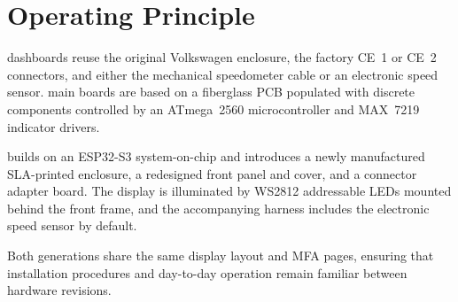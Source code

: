 \chapter{Operating Principle} \label{ch:operating-principle}

\ReplicaGenOne{} dashboards reuse the original Volkswagen enclosure, the factory CE~1 or CE~2 connectors, and either the mechanical speedometer cable or an electronic speed sensor.
\ReplicaGenOneShort{} main boards are based on a fiberglass PCB populated with discrete components controlled by an ATmega~2560 microcontroller and MAX~7219 indicator drivers.

\ReplicaNextLong{} builds on an ESP32-S3 system-on-chip and introduces a newly manufactured SLA-printed enclosure, a redesigned front panel and cover, and a connector adapter board.
The \ReplicaNextShort{} display is illuminated by WS2812 addressable LEDs mounted behind the front frame, and the accompanying harness includes the electronic speed sensor by default.

Both generations share the same display layout and MFA pages, ensuring that installation procedures and day-to-day operation remain familiar between hardware revisions.
